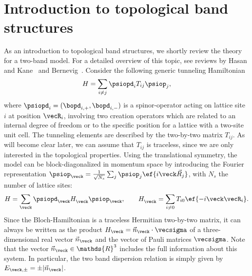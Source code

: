\section{Introduction to topological band structures}

As an introduction to topological band structures, we shortly review the theory for a two-band model.
For a detailed overview of this topic, see reviews by Hasan and Kane~\cite{Hasan2010} and Bernevig~\cite{Bernevig2013}.
Consider the following generic tunneling Hamiltonian
\begin{align}
    H = \sum_{i\ne j} \psiopd_i T_{ij} \psiop_j,
\end{align}
where $\psiopd_i = (\bopd_{i,+}, \bopd_{i,-})$ is a spinor-operator acting on lattice site $i$ at position $\vecR_i$, involving two creation operators which are related to an internal degree of freedom or to the specific position for a lattice with a two-site unit cell.
The tunneling elements are described by the two-by-two matrix $T_{ij}$.
As will become clear later, we can assume that $T_{ij}$ is traceless, since we are only interested in the topological properties.
Using the translational symmetry, the model can be block-diagonalized in momentum space by introducing the Fourier representation $\psiop_{\veck}=\frac{1}{\sqrt{N_s}}\sum_{j} \psiop_{j}\ef{i\veck\vec{R}_j}$, with $N_s$ the number of lattice sites:
\begin{align}
    H=\sum_\veck \psiopd_{\veck} H^{\vphantom\dag}_\veck \psiop_{\veck}, \qquad
    H^{\vphantom\dag}_\veck = \sum_{i\ne 0} T_{i0} \ef{-i\veck \vecR_i}.
\end{align}
Since the Bloch-Hamiltonian is a traceless Hermitian two-by-two matrix, it can always be written as the product $H_\veck = \vec{n}_\veck \cdot \vecsigma$ of a three-dimensional real vector $\vec{n}_{\veck}$ and the vector of Pauli matrices $\vecsigma$.
Note that the vector $\vec{n}_\veck \in \mathds{R}^3$ includes the full information about this system.
In particular, the two band dispersion relation is simply given by $E_{\veck,\pm} = \pm |\vec{n}_\veck|$.


